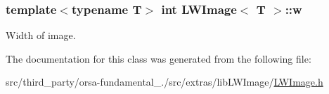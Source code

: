 \hypertarget{classLWImage_a5d5ffb936fcfa5c1459430af6f762baa}{}
\subsubsection[{w}]{\setlength{\rightskip}{0pt plus 5cm}template$<$typename T$>$ int {\bf L\+W\+Image}$<$ T $>$\+::w}\label{classLWImage_a5d5ffb936fcfa5c1459430af6f762baa}


Width of image. 



The documentation for this class was generated from the following file\+:\begin{DoxyCompactItemize}
\item 
src/third\+\_\+party/orsa-\/fundamental\+\_./src/extras/lib\+L\+W\+Image/\hyperlink{LWImage_8h}{L\+W\+Image.\+h}\end{DoxyCompactItemize}
